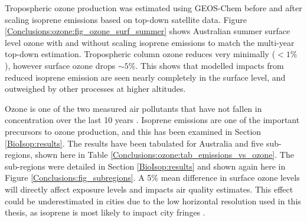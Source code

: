   
  Tropospheric ozone production was estimated using GEOS-Chem before and after scaling isoprene emissions based on top-down satellite data.
  Figure \ref{Conclusions:ozone:fig_ozone_surf_summer} shows Australian summer surface level ozone with and without scaling isoprene emissions to match the multi-year top-down estimation.
  Tropospheric column ozone reduces very minimally ($<1\%$), however surface ozone drops $\sim 5\%$.
  This shows that modelled impacts from reduced isoprene emission are seen nearly completely in the surface level, and outweighed by other processes at higher altitudes.
  
  Ozone is one of the two measured air pollutants that have not fallen in concentration over the last 10 years \parencite{SOE2016}.
  Isoprene emissions are one of the important precursors to ozone production, and this has been examined in Section \ref{BioIsop:results}.
  The results have been tabulated for Australia and five sub-regions, shown here in Table \ref{Conclusions:ozone:tab_emissions_vs_ozone}.
  The sub-regions were detailed in Section \ref{BioIsop:results} and shown again here in Figure \ref{Conclusions:fig_subregions}. 
  A 5\% mean difference in surface ozone levels will directly affect exposure levels and impacts air quality estimates. 
  This effect could be underestimated in cities due to the low horizontal resolution used in this thesis, as isoprene is most likely to impact city fringes \parencite{Millet2016}.
  
  
  
